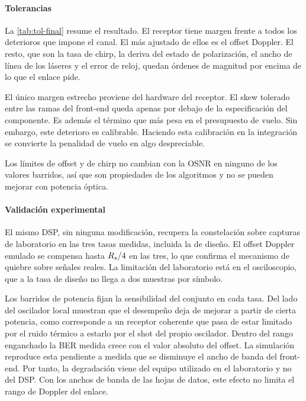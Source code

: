 \paragraph{Tolerancias}
La \cref{tab:tol-final} resume el resultado. El receptor tiene margen frente a
todos los deterioros que impone el canal. El m\'as ajustado de ellos es el
offset Doppler. El resto, que son la tasa de chirp, la deriva del estado de
polarizaci\'on, el ancho de l\'inea de los l\'aseres y el error de reloj,
quedan \'ordenes de magnitud por encima de lo que el enlace pide.

El \'unico margen estrecho proviene del hardware del receptor. El skew tolerado
entre las ramas del front-end queda apenas por debajo de la especificaci\'on
del componente. Es adem\'as el t\'ermino que m\'as pesa en el presupuesto de
vuelo. Sin embargo, este deterioro es calibrable. Haciendo esta calibraci\'on en la integraci\'on
se convierte la penalidad de vuelo en algo despreciable.

Los l\'imites de offset y de chirp no cambian con la OSNR en ninguno de los
valores barridos, as\'i que son propiedades de los algoritmos y no se pueden
mejorar con potencia \'optica.

\paragraph{Validaci\'on experimental}
El mismo DSP, sin ninguna modificaci\'on, recupera la constelaci\'on
sobre capturas de laboratorio en las tres tasas medidas, incluida la de
dise\~no. El offset Doppler emulado se compensa hasta $R_{s}/4$ en las tres, lo
que confirma el mecanismo de quiebre sobre se\~nales reales. La limitaci\'on del laboratorio
est\'a en el osciloscopio, que a la tasa de dise\~no no llega a dos muestras
por s\'imbolo.

Los barridos de potencia fijan la sensibilidad del conjunto en cada tasa. Del
lado del oscilador local muestran que el desempe\~no deja de mejorar a partir
de cierta potencia, como corresponde a un receptor coherente que pasa de estar
limitado por el ruido t\'ermico a estarlo por el shot del propio oscilador.
Dentro del rango enganchado la BER medida crece con el valor absoluto del
offset. La simulaci\'on reproduce esta pendiente a medida que se disminuye el
ancho de banda del front-end. Por tanto, la degradaci\'on viene del equipo utilizado en el laboratorio y no del DSP.
Con los anchos de banda de las hojas de datos, este efecto no limita el rango de Doppler del
enlace.

